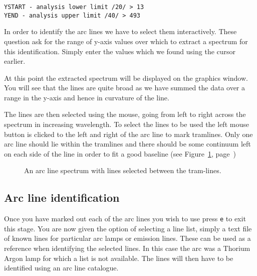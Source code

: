 \documentclass[twoside,11pt]{article}
\newcommand{\scspec}[2]{#1}
\newcommand{\scspec}[2]{#2}
\begin{document}
{\scspec{\small}{}
\begin{verbatim}
YSTART - analysis lower limit /20/ > 13
YEND - analysis upper limit /40/ > 493
\end{verbatim}
}



In order to identify the arc lines we have to select them
interactively. These question ask for the range of y-axis values over
which to extract a spectrum for this identification. Simply enter the
values which we found using the cursor earlier.

At this point the extracted spectrum will be displayed on the graphics
window. You will see that the lines are quite broad as we have summed
the data over a range in the y-axis and hence in curvature of the
line.

The lines are then selected using the mouse, going from left to right
across the spectrum in increasing wavelength. To select the lines to
be used the left mouse button is clicked to the left and right of the
arc line to mark tramlines. Only one arc line should lie within the
tramlines and there should be some continuum left on each side of the
line in order to fit a good baseline (see
\scspec{Figure~\ref{arc_select}, page~\pageref{arc_select}}{the figure
below.})


\begin{figure}
\begin{center}
\scspec{\leavevmode\epsfysize=105mm\epsfbox{sc7_14.eps}}
       {\leavevmode\epsfysize=136mm}

  \parbox{140mm}{
    \caption{An arc line spectrum with lines selected between the 
             tram-lines.}
    \label{arc_select}
  }
\end{center}
\end{figure}


\subsection{Arc line identification}

Once you have marked out each of the arc lines you wish to use press
{\tt e} to exit this stage. You are now given the option of selecting
a line list, simply a text file of known lines for particular arc
lamps or emission lines. These can be used as a reference when
identifying the selected lines. In this case the arc was a Thorium
Argon lamp for which a list is not available. The lines will then have
to be identified using an arc line catalogue.
\goodbreak
\end{document}
